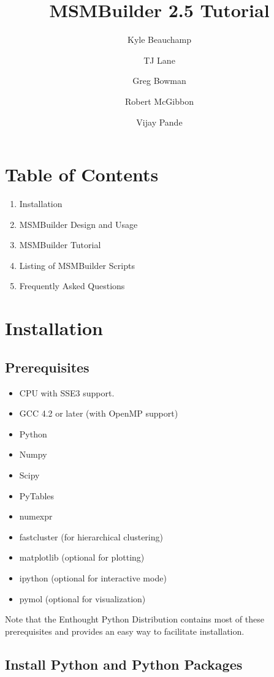 \documentclass[12pt]{article}
\title
{MSMBuilder 2.5 Tutorial
}
\author{Kyle Beauchamp \and TJ Lane \and Greg Bowman \and  Robert McGibbon \and Vijay Pande}
\begin{document}
\maketitle

\section{Table of Contents}
\begin{enumerate}
\item Installation
\item MSMBuilder Design and Usage
\item MSMBuilder Tutorial
\item Listing of MSMBuilder Scripts
\item Frequently Asked Questions
\end{enumerate}

\newpage

\section{Installation}

\subsection{Prerequisites}
\begin{itemize}
\item CPU with SSE3 support.
\item GCC 4.2 or later (with OpenMP support)
\item Python
\item Numpy
\item Scipy
\item PyTables
\item numexpr
\item fastcluster (for hierarchical clustering)
\item matplotlib (optional for plotting)
\item ipython (optional for interactive mode)
\item pymol (optional for visualization)
\end{itemize}
Note that the Enthought Python Distribution contains most of these prerequisites and provides an easy way to facilitate installation.

\subsection{Install Python and Python Packages}
\end{document}
